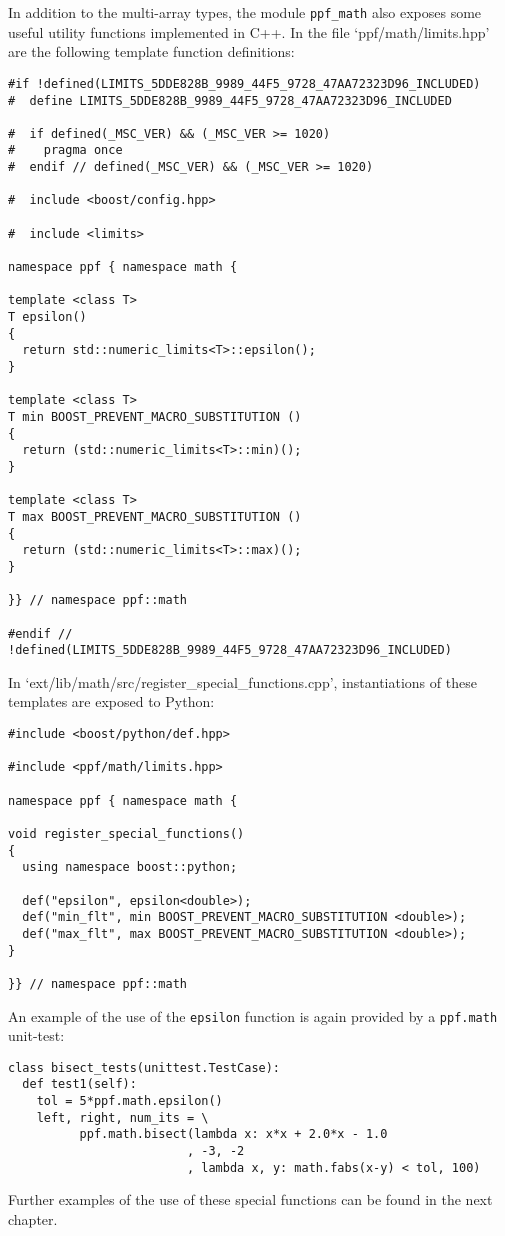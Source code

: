 In addition to the multi-array types, the module \verb|ppf_math|
also exposes some useful utility functions implemented in C++. In
the file `ppf/math/limits.hpp' are the following template
function definitions:
\begin{verbatim}
#if !defined(LIMITS_5DDE828B_9989_44F5_9728_47AA72323D96_INCLUDED)
#  define LIMITS_5DDE828B_9989_44F5_9728_47AA72323D96_INCLUDED

#  if defined(_MSC_VER) && (_MSC_VER >= 1020)
#    pragma once
#  endif // defined(_MSC_VER) && (_MSC_VER >= 1020)

#  include <boost/config.hpp>

#  include <limits>

namespace ppf { namespace math {

template <class T>
T epsilon()
{
  return std::numeric_limits<T>::epsilon();
}

template <class T>
T min BOOST_PREVENT_MACRO_SUBSTITUTION ()
{
  return (std::numeric_limits<T>::min)();
}

template <class T>
T max BOOST_PREVENT_MACRO_SUBSTITUTION ()
{
  return (std::numeric_limits<T>::max)();
}

}} // namespace ppf::math

#endif // !defined(LIMITS_5DDE828B_9989_44F5_9728_47AA72323D96_INCLUDED)
\end{verbatim}
In `ext/lib/math/src/register\_special\_functions.cpp', instantiations
of these templates are exposed to Python:
\begin{verbatim}
#include <boost/python/def.hpp>

#include <ppf/math/limits.hpp>

namespace ppf { namespace math {

void register_special_functions()
{
  using namespace boost::python;

  def("epsilon", epsilon<double>);
  def("min_flt", min BOOST_PREVENT_MACRO_SUBSTITUTION <double>);
  def("max_flt", max BOOST_PREVENT_MACRO_SUBSTITUTION <double>);
}

}} // namespace ppf::math
\end{verbatim}
An example of the use of the \verb|epsilon| function is again provided by
a \verb|ppf.math| unit-test:
\begin{verbatim}
class bisect_tests(unittest.TestCase):
  def test1(self):
    tol = 5*ppf.math.epsilon()
    left, right, num_its = \
          ppf.math.bisect(lambda x: x*x + 2.0*x - 1.0
                         , -3, -2
                         , lambda x, y: math.fabs(x-y) < tol, 100)
\end{verbatim}
Further examples of the use of these special functions can be found in
the next chapter.

